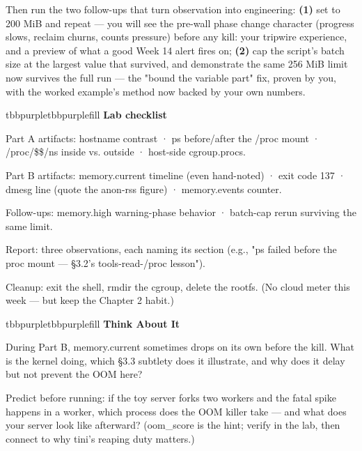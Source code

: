Then run the two follow-ups that turn observation into engineering: \textbf{(1)} set  to 200 MiB and repeat — you will see the pre-wall phase change character (progress slows, reclaim churns,  counts pressure) before any kill: your tripwire experience, and a preview of what a good Week 14 alert fires on; \textbf{(2)} cap the script's batch size at the largest value that survived, and demonstrate the same 256 MiB limit now survives the full run — the "bound the variable part" fix, proven by you, with the worked example's method now backed by your own numbers.

\begin{calloutbox}{tbbpurple}{tbbpurplefill}
{\normalsize\bfseries\color{tbbpurple}Lab checklist}\par\vspace{3pt}
\begin{tbbitemize}
  \item Part A artifacts: hostname contrast · ps before/after the /proc mount · /proc/\$\$/ns inside vs. outside · host-side cgroup.procs.
  \item Part B artifacts: memory.current timeline (even hand-noted) · exit code 137 · dmesg line (quote the anon-rss figure) · memory.events counter.
  \item Follow-ups: memory.high warning-phase behavior · batch-cap rerun surviving the same limit.
  \item Report: three observations, each naming its section (e.g., "ps failed before the proc mount — §3.2's tools-read-/proc lesson").
  \item Cleanup: exit the shell, rmdir the cgroup, delete the rootfs. (No cloud meter this week — but keep the Chapter 2 habit.)
\end{tbbitemize}
\end{calloutbox}

\vspace{3.0pt}

\begin{calloutbox}{tbbpurple}{tbbpurplefill}
{\normalsize\bfseries\color{tbbpurple}Think About It}\par\vspace{3pt}
\begin{tbbitemize}
  \item During Part B, memory.current sometimes drops on its own before the kill. What is the kernel doing, which §3.3 subtlety does it illustrate, and why does it delay but not prevent the OOM here?
  \item Predict before running: if the toy server forks two workers and the fatal spike happens in a worker, which process does the OOM killer take — and what does your server look like afterward? (oom\_score is the hint; verify in the lab, then connect to why tini's reaping duty matters.)
\end{tbbitemize}
\end{calloutbox}

